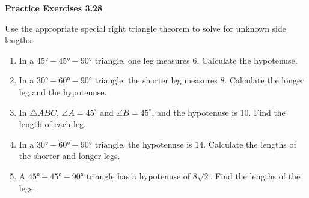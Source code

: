 \vspace{0.3ex}
\noindent\textbf{Practice Exercises 3.28}

\vspace{0.2ex}

Use the appropriate special right triangle theorem to solve for unknown side lengths.

\begin{enumerate}[label=\color{blue}\arabic*.]
    \item In a \(45°-45°-90°\) triangle, one leg measures \(6\). Calculate the hypotenuse.
    \item In a \(30°-60°-90°\) triangle, the shorter leg measures \(8\). Calculate the longer leg and the hypotenuse.
    \item In \(\triangle ABC\), \(\angle A = 45^\circ\) and \(\angle B = 45^\circ\), and the hypotenuse is \(10\). Find the length of each leg.
    \item In a \(30°-60°-90°\) triangle, the hypotenuse is \(14\). Calculate the lengths of the shorter and longer legs.
    \item A \(45°-45°-90°\) triangle has a hypotenuse of \(8\sqrt{2}\). Find the lengths of the legs.
\end{enumerate}


